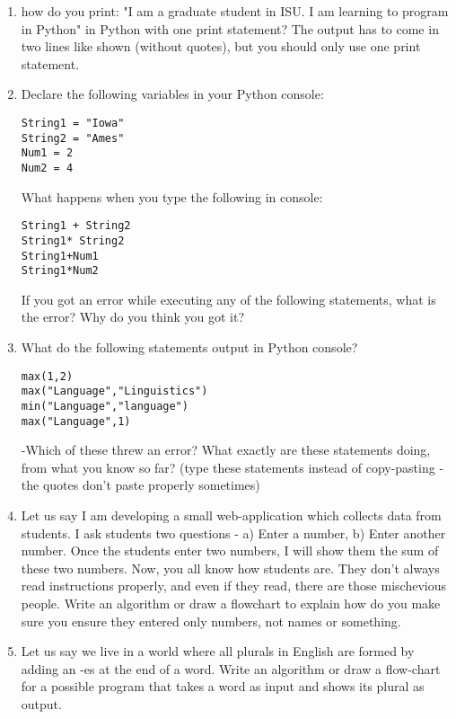 \documentclass[11pt,a4paper]{article}
\begin{document}
\begin{enumerate}
\item how do you print: 
"I am a graduate student in ISU. \newline
I am learning to program in Python" 
in Python with one print statement? The output has to come in two lines like shown (without quotes), but you should only use one print statement.

\item Declare the following variables in your Python console: \begin{verbatim}
String1 = "Iowa"
String2 = "Ames"
Num1 = 2
Num2 = 4
\end{verbatim}
What happens when you type the following in console:
\begin{verbatim}
String1 + String2
String1* String2
String1+Num1
String1*Num2
\end{verbatim}
If you got an error while executing any of the following statements, what is the error? Why do you think you got it?

\item What do the following statements output in Python console? 
\begin{verbatim}
max(1,2)
max("Language","Linguistics")
min("Language","language")
max("Language",1)
\end{verbatim}
-Which of these threw an error? What exactly are these statements doing, from what you know so far? 
(type these statements instead of copy-pasting - the quotes don't paste properly sometimes)

\item Let us say I am developing a small web-application which collects data from students. I ask students two questions - 
a) Enter a number, b) Enter another number. Once the students enter two numbers, I will show them the sum of these two numbers. Now, you all know how students are.
They don't always read instructions properly, and even if they read, there are those mischevious people. Write an algorithm or draw a flowchart to explain how do you make sure you ensure they entered only numbers, not names or something.

\item Let us say we live in a world where all plurals in English are formed by adding an -es at the end of a word. Write an algorithm or draw a flow-chart for a possible program that takes a word as input and shows its plural as output.

\end{enumerate}
\end{document}
